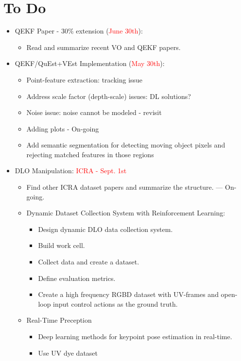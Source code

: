 \documentclass[11pt]{article}
\begin{document}
\section{To Do}
\begin{itemize}
  \item QEKF Paper - 30\% extension (\textcolor{red}{June 30th}):
  \begin{itemize}
      \item Read and summarize recent VO and QEKF papers.
  \end{itemize}
  \item QEKF/QuEst+VEst Implementation (\textcolor{red}{May 30th}):
  \begin{itemize}
      \item Point-feature extraction: tracking issue
      \item Address scale factor (depth-scale) issues: DL solutions?
      \item Noise issue: noise cannot be modeled - revisit
      \item Adding plots - On-going
      \item Add semantic segmentation for detecting moving object pixels and rejecting matched features in those regions
  \end{itemize}
  \item  DLO Manipulation:  \textcolor{red}{ICRA - Sept. 1st}
  \begin{itemize}
      \item Find other ICRA dataset papers and summarize the structure. --- On-going.
      \item Dynamic Dataset Collection System with Reinforcement Learning:
      \begin{itemize}
        \item Design dynamic DLO data collection system.
        \item Build work cell.
        \item Collect data and create a dataset.
        \item Define evaluation metrics.
        \item Create a high frequency RGBD dataset with UV-frames and open-loop input control actions as the ground truth.
      \end{itemize}
      \item Real-Time Preception
      \begin{itemize}
        \item Deep learning methods for keypoint pose estimation in real-time.
        \item Use UV dye dataset

\end{itemize}
\end{itemize}
\end{itemize}
\end{document}
